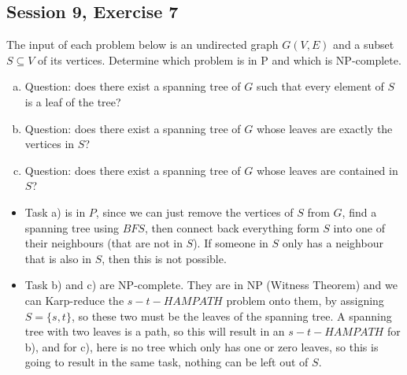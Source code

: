 \subsection {Session 9, Exercise 7}


The input of each problem below is an undirected graph $G(V,E)$ and a subset $S \subseteq{} V$ of its vertices.
Determine which problem is in P and which is NP-complete.
\begin{enumerate}[a)]
    \item Question: does there exist a spanning tree of $G$ such that every element of $S$ is a leaf of the tree?
    \item Question: does there exist a spanning tree of $G$ whose leaves are exactly the vertices in $S$?
    \item Question: does there exist a spanning tree of $G$ whose leaves are contained in $S$?
\end{enumerate}


\begin{itemize}
    \item Task a) is in $P$, since we can just remove the vertices of $S$ from $G$, find a spanning tree using $BFS$, then connect back everything form $S$ into one of their neighbours (that are not in $S$). If someone in $S$ only has a neighbour that is also in $S$, then this is not possible.
    \item Task b) and c) are NP-complete. They are in NP (Witness Theorem) and we can Karp-reduce the $s-t-HAMPATH$ problem onto them, by assigning $S=\{s,t\}$, so these two must be the leaves of the spanning tree. A spanning tree with two leaves is a path, so this will result in an $s-t-HAMPATH$ for b), and for c), here is no tree which only has one or zero leaves, so this is going to result in the same task, nothing can be left out of $S$.
\end{itemize}